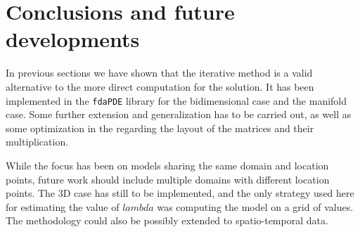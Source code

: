 
\chapter{Conclusions and future developments} \label{ch:Conclusions} In
previous sections we have shown that the iterative method is a valid
alternative to the more direct computation for the solution. It has been
implemented in the \texttt{fdaPDE} library for the bidimensional case and the
manifold case. Some further extension and generalization has to be carried out,
as well as some optimization in the regarding the layout of the matrices and
their multiplication.

While the focus has been on models sharing the same domain and location points,
future work should include multiple domains with different location points.
The 3D case has still to be implemented, and the only strategy used here for
estimating the value of $lambda$ was computing the model on a grid of values.
The methodology could also be possibly extended to spatio-temporal data.

%
